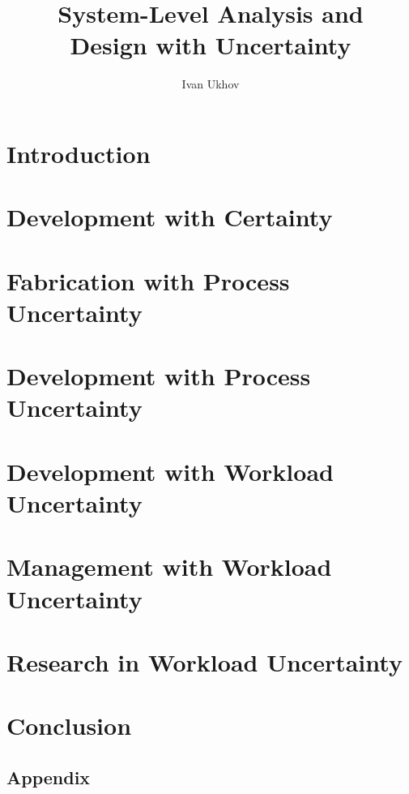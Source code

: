 \documentclass{thesis}
\title{
  System-Level Analysis and\\[0.3em]
  Design with Uncertainty
}
\author{Ivan Ukhov}
\begin{document}
\nocite{
  ukhov2012,
  ukhov2014a,
  ukhov2014b,
  ukhov2015,
  ukhov2017a,
  ukhov2017b,
  ukhov2017c,
}

\chapter{Introduction}
\newcommand{\inputsection}[1]{}


\chapter{Development with Certainty}
\renewcommand{\inputsection}[1]{}


\chapter{Fabrication with Process Uncertainty}
\renewcommand{\inputsection}[1]{}


\chapter{Development with Process Uncertainty}
\renewcommand{\inputsection}[1]{}


\chapter{Development with Workload Uncertainty}
\renewcommand{\inputsection}[1]{}


\chapter{Management with Workload Uncertainty}
\renewcommand{\inputsection}[1]{}


\chapter{Research in Workload Uncertainty}
\renewcommand{\inputsection}[1]{}


\chapter{Conclusion}


\begin{appendices}
\chapter{Appendix}
\renewcommand{\inputsection}[1]{}

\end{appendices}

\printbibliography
\end{document}
